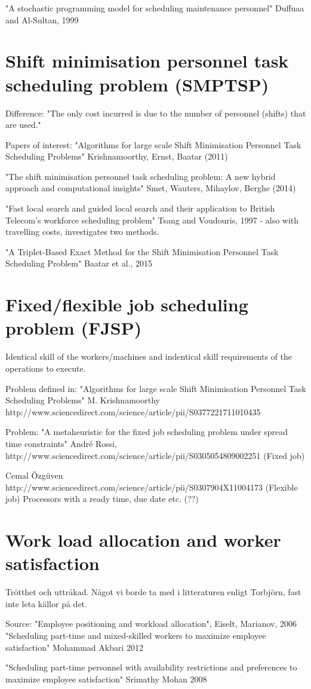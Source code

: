 "A stochastic programming model for scheduling maintenance personnel" Duffuaa and Al-Sultan, 1999

\section{Shift minimisation personnel task scheduling problem (SMPTSP)}\label{SMTSP}
Difference: "The only cost incurred is due to the number of personnel (shifts) that are used."

Papers of interest:
"Algorithms for large scale Shift Minimisation Personnel Task Scheduling Problems" Krishnamoorthy, Ernst, Baatar (2011)

"The shift minimisation personnel task scheduling problem: A new hybrid approach and computational insights" Smet, Wauters, Mihaylov, Berghe (2014)

"Fast local search and guided local search and their application to British Telecom's workforce scheduling problem" Tsang and Voudouris, 1997 - also with travelling costs, investigates two methods.

"A Triplet-Based Exact Method for the Shift Minimisation Personnel Task Scheduling Problem" Baatar et al., 2015

\section{Fixed/flexible job scheduling problem (FJSP)}\label{FJSP}
Identical skill of the workers/machines and indentical skill requirements of the operations to execute.

Problem defined in: "Algorithms for large scale Shift Minimisation Personnel Task Scheduling Problems" M. Krishnamoorthy
http://www.sciencedirect.com/science/article/pii/S0377221711010435

Problem: "A metaheuristic for the fixed job scheduling problem under spread time constraints" André Rossi, http://www.sciencedirect.com/science/article/pii/S0305054809002251 (Fixed job)

Cemal Özgüven
http://www.sciencedirect.com/science/article/pii/S0307904X11004173 (Flexible job)
Processors with a ready time, due date etc. (??)

\section{Work load allocation and worker satisfaction} \label{WLA}
Trötthet och uttråkad. Något vi borde ta med i litteraturen enligt Torbjörn, fast inte leta källor på det.

Source: "Employee positioning and workload allocation", Eiselt, Marianov, 2006
"Scheduling part-time and mixed-skilled workers to maximize employee satisfaction" Mohammad Akbari 2012

"Scheduling part-time personnel with availability restrictions and preferences to maximize employee satisfaction" Srimathy Mohan 2008



